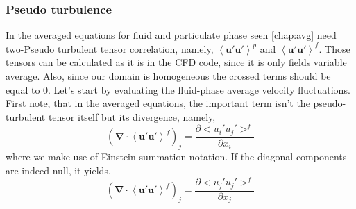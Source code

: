 \subsubsection{Pseudo turbulence}
In the averaged equations for fluid and particulate phase seen \ref{chap:avg} need two-Pseudo turbulent tensor correlation,
namely, $\left<\bm{u'u'}\right>^p$ and $\left<\bm{u'u'}\right>^f$. 
Those tensors can be calculated as it is in the CFD code, since it is only fields variable average. 
Also, since our domain is homogeneous the crossed terms should be equal to 0.
Let's start by evaluating the fluid-phase average velocity fluctuations.
First note, that in the averaged equations, the important term isn't the pseudo-turbulent tensor itself but its divergence, namely,
\begin{equation*}    
    \left(\bm{\nabla} \cdot \left<\bm{u}'\bm{u}'\right>^f \right)_j = \frac{\partial <u_i' u_j'>^f}{\partial x_i}
\end{equation*}
where we make use of Einstein summation notation.
If the diagonal components are indeed null, it yields,
\begin{equation*}    
    \left(\bm{\nabla} \cdot \left<\bm{u}'\bm{u}'\right>^f \right)_j = \frac{\partial <u_j' u_j'>^f}{\partial x_j}
\end{equation*}
